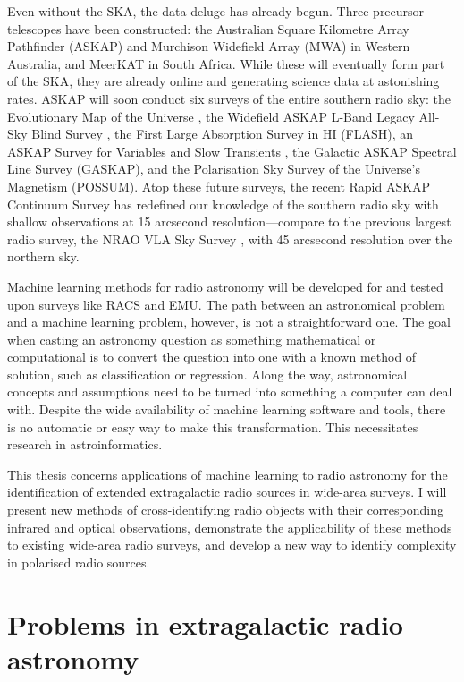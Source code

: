 Even without the SKA, the data deluge has already begun. Three precursor telescopes have been constructed: the Australian Square Kilometre Array Pathfinder (ASKAP) and Murchison Widefield Array (MWA) in Western Australia, and MeerKAT in South Africa. While these will eventually form part of the SKA, they are already online and generating science data at astonishing rates. ASKAP will soon conduct six surveys of the entire southern radio sky: the Evolutionary Map of the Universe \citep[EMU;][]{norris11,kapinska_emu_2020}, the Widefield ASKAP L-Band Legacy All-Sky Blind Survey \citep[WALLABY]{koribalski_wallaby_2020}, the First Large Absorption Survey in HI (FLASH), an ASKAP Survey for Variables and Slow Transients \citep[VAST;][]{murphy_vast_2013}, the Galactic ASKAP Spectral Line Survey (GASKAP), and the Polarisation Sky Survey of the Universe's Magnetism (POSSUM). Atop these future surveys, the recent Rapid ASKAP Continuum Survey \citep[RACS;][]{mcconnell_rapid_2020} has redefined our knowledge of the southern radio sky with shallow observations at 15 arcsecond resolution---compare to the previous largest radio survey, the NRAO VLA Sky Survey \citep[NVSS;][]{condon98nvss}, with 45 arcsecond resolution over the northern sky.

Machine learning methods for radio astronomy will be developed for and tested upon surveys like RACS and EMU. The path between an astronomical problem and a machine learning problem, however, is not a straightforward one. The goal when casting an astronomy question as something mathematical or computational is to convert the question into one with a known method of solution, such as classification or regression. Along the way, astronomical concepts and assumptions need to be turned into something a computer can deal with. Despite the wide availability of machine learning software and tools, there is no automatic or easy way to make this transformation. This necessitates research in astroinformatics.

This thesis concerns applications of machine learning to radio astronomy for the identification of extended extragalactic radio sources in wide-area surveys. I will present new methods of cross-identifying radio objects with their corresponding infrared and optical observations, demonstrate the applicability of these methods to existing wide-area radio surveys, and develop a new way to identify complexity in polarised radio sources.


\section{Problems in extragalactic radio astronomy}
\label{sec:problems-radio-astronomy}

